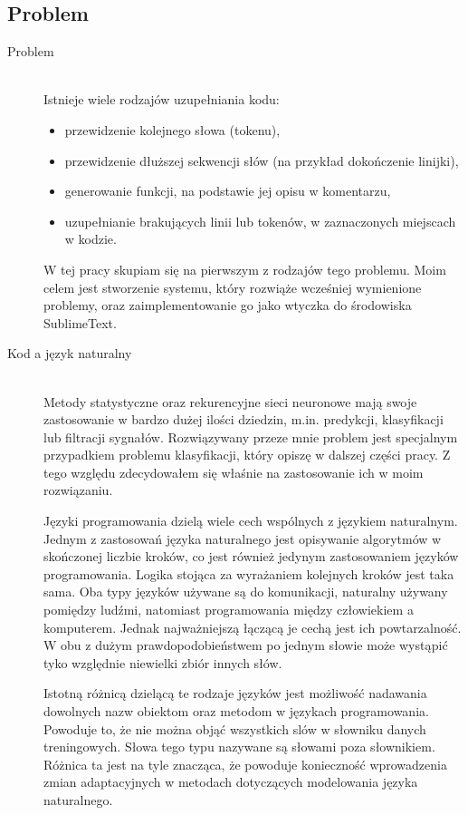 \subsection{Problem}
\begin{description}
\item[Problem]
\hfill\\
Istnieje wiele rodzajów uzupełniania kodu: 
\begin{itemize}
	\item przewidzenie kolejnego słowa (tokenu),
	\item przewidzenie dłuższej sekwencji słów (na przykład dokończenie linijki),
	\item generowanie funkcji, na podstawie jej opisu w komentarzu,
	\item uzupełnianie brakujących linii lub tokenów, w zaznaczonych miejscach w kodzie.
\end{itemize}
W tej pracy skupiam się na pierwszym z rodzajów tego problemu. Moim celem jest stworzenie systemu, który rozwiąże 
wcześniej wymienione problemy, oraz zaimplementowanie go jako wtyczka do środowiska SublimeText. \\

\item[Kod a język naturalny]
\hfill\\
\label{similarities}
Metody statystyczne oraz rekurencyjne sieci neuronowe mają swoje zastosowanie w bardzo dużej ilości dziedzin, m.in. 
predykcji, klasyfikacji lub filtracji sygnałów. Rozwiązywany przeze mnie problem jest specjalnym przypadkiem problemu 
klasyfikacji, który opiszę w dalszej części pracy. Z tego względu zdecydowałem się właśnie na zastosowanie ich w moim rozwiązaniu.  

Języki programowania dzielą wiele cech wspólnych z językiem naturalnym.
Jednym z zastosowań języka naturalnego jest opisywanie algorytmów w skończonej liczbie kroków, co jest również jedynym zastosowaniem 
języków programowania. Logika stojąca za wyrażaniem kolejnych kroków jest taka sama. Oba typy języków używane są 
do komunikacji, naturalny używany pomiędzy ludźmi, natomiast programowania między człowiekiem a komputerem. 
Jednak najważniejszą łączącą je cechą jest ich powtarzalność. W obu z dużym prawdopodobieństwem po jednym 
słowie może wystąpić tyko względnie niewielki zbiór innych słów. 

Istotną różnicą dzielącą te rodzaje języków jest możliwość nadawania dowolnych nazw obiektom oraz metodom w językach programowania. 
Powoduje to, że nie można objąć wszystkich slów w słowniku danych treningowych. Słowa tego typu nazywane są słowami poza 
słownikiem. Różnica ta jest na tyle znacząca, że powoduje konieczność wprowadzenia zmian adaptacyjnych w 
metodach dotyczących modelowania języka naturalnego. \\


\end{description}
